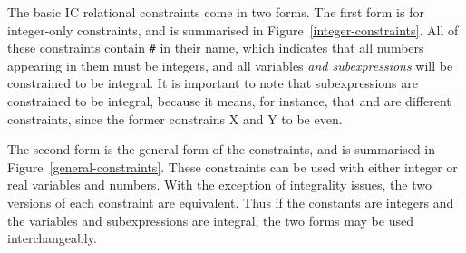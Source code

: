 %

The basic IC relational constraints come in two forms.  The first form is
for integer-only constraints, and is summarised in
Figure~\ref{integer-constraints}.  All of these constraints contain
\texttt{\#} in their name, which indicates that all numbers appearing in
them must be integers, and all variables \emph{and subexpressions} will be
constrained to be integral.  It is important to note that subexpressions are
constrained to be integral, because it means, for instance, that
 and  are different
constraints, since the former constrains X and Y to be even.

The second form is the general form of the constraints, and is summarised in
Figure~\ref{general-constraints}.  These constraints can be used with either
integer or real variables and numbers.  With the exception of integrality
issues, the two versions of each constraint are equivalent.  Thus if the
constants are integers and the variables and subexpressions are integral,
the two forms may be used interchangeably.

